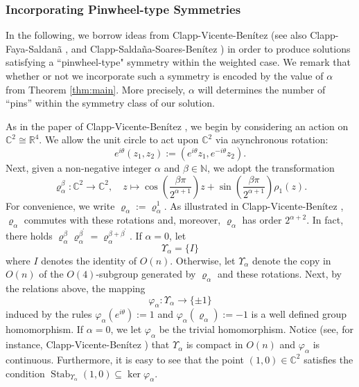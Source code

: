 \documentclass[10pt, reqno]{amsart}
\newcommand{\NN}{\mathbb{N}}
\newcommand{\RR}{\mathbb{R}}
\newcommand{\CC}{\mathbb{C}}
\numberwithin{equation}{section}
\theoremstyle{definition}
\theoremstyle{remark}
\theoremstyle{plain}
\begin{document}
	
	\subsubsection{Incorporating Pinwheel-type Symmetries}\label{section:genInfinity}
	
	In the following, we borrow ideas from Clapp-Vicente-Ben\'itez \cite{clapp2026entire} (see also Clapp-Faya-Saldan\~a \cite{Clapp_2024}, and Clapp-Salda\~na-Soares-Ben\'itez \cite{clapp2025optimal})
	in order to produce solutions satisfying a ``pinwheel-type" symmetry within the weighted case. We remark that whether or not we incorporate such a symmetry is encoded by the value of $\alpha$ from Theorem \ref{thm:main}. More precisely, $\alpha$ will determines the number of ``pins'' within the symmetry class of our solution. 
	
	As in the paper of Clapp-Vicente-Ben\'itez \cite{clapp2026entire}, we begin by considering an action on $\CC^2 \cong \RR^4$. We allow the unit circle to act upon $\CC^2$ via asynchronous rotation:
	\[
	e^{i\theta}(z_1,z_2) := (e^{i\theta}z_1, e^{-i\theta}z_2).
	\]
	Next, given a non-negative integer $\alpha$ and $\beta \in \NN$, we adopt the transformation 
	\[
	\varrho_\alpha^\beta : \CC^2 \to \CC^2, \quad	
	z \mapsto \cos\left( \frac{\beta\pi}{2^{\alpha+1}} \right)z + \sin\left( \frac{\beta\pi}{2^{\alpha+1}} \right)\rho_1(z).
	\]
	For convenience, we write $\varrho_\alpha := \varrho_\alpha^1$. As illustrated in Clapp-Vicente-Ben\'itez \cite{clapp2026entire}, $\varrho_\alpha$ commutes with these rotations and, moreover, $\varrho_\alpha$ has order $2^{\alpha+2}$. In fact, there holds $\varrho_\alpha^{\beta}\varrho_\alpha^{\beta^\prime} = \varrho_\alpha^{\beta+\beta^\prime}$. If $\alpha = 0$, let
	\[
	\Upsilon_\alpha = \{I\}
	\]
	where $I$ denotes the identity of $O(n)$. Otherwise, let $\Upsilon_\alpha$ denote the copy in $O(n)$ of the $O(4)$-subgroup generated by $\varrho_\alpha$ and these rotations.  Next, by the relations above, the mapping
	\[
	\varphi_\alpha : \Upsilon_\alpha \to \{ \pm 1 \}
	\]
	induced by the rules $\varphi_\alpha(e^{i\theta}) := 1$ and $\varphi_\alpha(\varrho_\alpha) := -1$ is a well defined group homomorphism. If $\alpha = 0$, we let $\varphi_\alpha$ be the trivial homomorphism. Notice (see, for instance, Clapp-Vicente-Ben\'itez \cite{clapp2026entire}) that $\Upsilon_\alpha$ is compact in $O(n)$ and $\varphi_\alpha$ is continuous. Furthermore, it is easy to see that the point $(1,0) \in \CC^2$ satisfies the condition $\operatorname{Stab}_{\Upsilon_\alpha}(1,0) \subseteq \ker{\varphi_\alpha}$.
	
\end{document}
